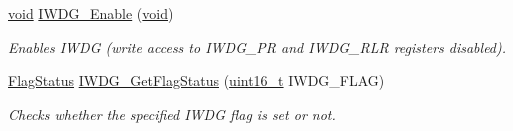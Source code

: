 \begin{DoxyCompactItemize}
\hyperlink{usb__devapi_8h_afabf60e7f57651d6d595a02c75f07cd0}{void} \hyperlink{group___i_w_d_g___exported___functions_ga479b2921c86f8c67b819f5c4bea6bdb6}{I\+W\+D\+G\+\_\+\+Enable} (\hyperlink{usb__devapi_8h_afabf60e7f57651d6d595a02c75f07cd0}{void})
\begin{DoxyCompactList}\small\item\em Enables I\+W\+DG (write access to I\+W\+D\+G\+\_\+\+PR and I\+W\+D\+G\+\_\+\+R\+LR registers disabled). \end{DoxyCompactList}\item 
\hyperlink{agilefox_2library_2inc_2stm32f10x__type_8h_a89136caac2e14c55151f527ac02daaff}{Flag\+Status} \hyperlink{group___i_w_d_g___exported___functions_ga37f050cfbedc0c15f9e0816c0b22011e}{I\+W\+D\+G\+\_\+\+Get\+Flag\+Status} (\hyperlink{_p_e___types_8h_a1f1825b69244eb3ad2c7165ddc99c956}{uint16\+\_\+t} I\+W\+D\+G\+\_\+\+F\+L\+AG)
\begin{DoxyCompactList}\small\item\em Checks whether the specified I\+W\+DG flag is set or not. \end{DoxyCompactList}\end{DoxyCompactItemize}
